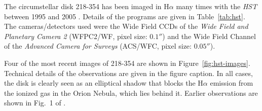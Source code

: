 \documentclass[oneside, 11pt]{article}
\begin{document}
The circumstellar disk 218-354 has been imaged in H\(\alpha\) many times with the \textit{HST} between 1995 and 2005  \citep{McCaughrean:1996a, ODell:2001c, Bally:2006a, Ricci:2008a, Robberto:2013a}.   Details of the programs are given in Table~\ref{tab:hst}.  The cameras/detectors used were the Wide Field CCDs of the \textit{Wide Field and Planetary Camera 2} (WFPC2/WF, pixel size: \(0.1''\)) and the Wide Field Channel of the \textit{Advanced Camera for Surveys} (ACS/WFC, pixel size: \(0.05''\)).   

Four of the most recent images of 218-354 are shown in Figure~\ref{fig:hst-images}.   Technical details of the observations are given in the figure caption.   In all cases, the disk is clearly seen as an elliptical shadow that blocks the H\(\alpha\) emission from the ionized gas in the Orion Nebula, which lies behind it.   Earlier observations are shown in Fig.~1 of \citet{McCaughrean:1996a}. 
\end{document}
